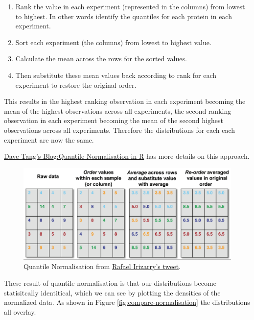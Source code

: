 \documentclass[12pt,]{book}
\providecommand{\tightlist}{%
  \setlength{\itemsep}{0pt}\setlength{\parskip}{0pt}}
\theoremstyle{definition}
\theoremstyle{definition}
\theoremstyle{definition}
\theoremstyle{remark}
\begin{document}
\begin{enumerate}
\def\labelenumi{(\roman{enumi})}
\tightlist
\item
  Rank the value in each experiment (represented in the columns) from
  lowest to highest. In other words identify the quantiles for each
  protein in each experiment.
\item
  Sort each experiment (the columns) from lowest to highest value.
\item
  Calculate the mean across the rows for the sorted values.
\item
  Then substitute these mean values back according to rank for each
  experiment to restore the original order.
\end{enumerate}

This results in the highest ranking observation in each experiment
becoming the mean of the highest observations across all experiments,
the second ranking observation in each experiment becoming the mean of
the second highest observations across all experiments. Therefore the
distributions for each each experiment are now the same.

\href{https://davetang.org/muse/2014/07/07/quantile-normalisation-in-r/}{Dave
Tang's Blog:Quantile Normalisation in R} has more details on this
approach.





\begin{figure}

{\centering \includegraphics[width=0.8\linewidth]{img/quant_norm} 

}

\caption{Quantile Normalisation from
\href{https://twitter.com/rafalab/status/545586012219772928?ref_src=twsrc\%5Etfw}{Rafael
Irizarry's tweet}.}\label{fig:quant-norm}
\end{figure}

These result of quantile normalisation is that our distributions become
statisitcally identitical, which we can see by plotting the densities of
the normalized data. As shown in Figure \ref{fig:compare-normalisation}
the distributions all overlay.
\end{document}
